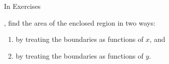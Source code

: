 {\noindent In Exercises}
{, find the area of the enclosed region in two ways:
		\begin{enumerate}
		\item		by treating the boundaries as functions of $x$, and
		\item		by treating the boundaries as functions of $y$.
		\end{enumerate}
}
